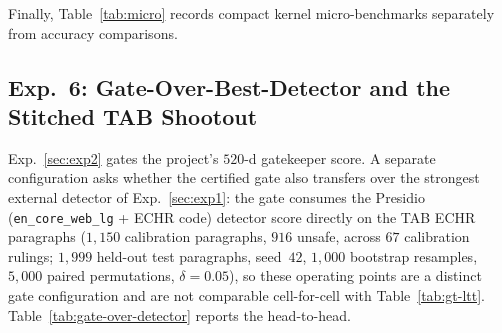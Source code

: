 \documentclass{article}
\begin{document}
Finally, Table~\ref{tab:micro} records compact kernel micro-benchmarks separately from accuracy comparisons.

\begin{table}[t]
\caption{Compact kernel micro-benchmarks (systems sanity metrics, distinct from competitive accuracy benchmarks).}
\label{tab:micro}
\vskip 0.08in
\begin{center}
\end{center}
\vskip -0.14in
\end{table}

\subsection{Exp.~6: Gate-Over-Best-Detector and the Stitched TAB Shootout}
\label{sec:exp6}

Exp.~\ref{sec:exp2} gates the project's $520$-d gatekeeper score. A separate configuration asks whether the certified gate also transfers over the strongest external detector of Exp.~\ref{sec:exp1}: the gate consumes the Presidio (\texttt{en\_core\_web\_lg} + ECHR code) detector score directly on the TAB ECHR paragraphs ($1{,}150$ calibration paragraphs, $916$ unsafe, across $67$ calibration rulings; $1{,}999$ held-out test paragraphs, seed~$42$, $1{,}000$ bootstrap resamples, $5{,}000$ paired permutations, $\delta{=}0.05$), so these operating points are a distinct gate configuration and are not comparable cell-for-cell with Table~\ref{tab:gt-ltt}. Table~\ref{tab:gate-over-detector} reports the head-to-head.
\end{document}
